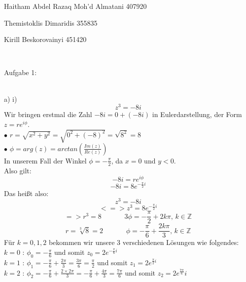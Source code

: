 \documentclass[11pt]{article}
\begin{document}
	\noindent \begin{huge}Haitham Abdel Razaq Moh'd Almatani  407920
	
	\noindent Themistoklis Dimaridis 355835
	
	
	\noindent Kirill Beskorovainyi 	451420\end{huge}\\\vspace{0.05in}
	
		\noindent \begin{Large}Aufgabe 1:\end{Large}\\[2pt]
			\indent a) \hspace{20pt} i)\\
				$$z^3 = -8i$$
				Wir bringen erstmal die Zahl $-8i=0+(-8i)$ in Eulerdarstellung, der Form $z=re^{i\phi}$.\\
				$\bullet$  $r=\sqrt{x^2+y^2}=\sqrt{0^2+(-8)^2}=\sqrt{8^2}=8$\\
				$\bullet$  $\phi = arg(z) = arctan\left(\frac{Im(z)}{Re(z)}\right)$\\
				\indent \indent In unserem Fall der Winkel $\phi = -\frac{\pi}{2}$, da $x=0$ und $y<0$.\\
				Also gilt:\\
				$$-8i=re^{i\phi}$$
				$$-8i=8e^{-\frac{\pi}{2}i}$$
				Das heißt also:\\
				$$z^3=-8i$$
				$$<=>z^3=8e^{-\frac{\pi}{2}i}$$
				$$=> r^3 = 8 \hspace{40pt} 3\phi = -\frac{\pi}{2}+2k\pi \mbox{, } k\in \mathbb{Z}$$
				$$r=\sqrt[3]{8}=2 \hspace{40pt} \phi = -\frac{\pi}{6}+\frac{2k\pi}{3} \mbox{, } k\in \mathbb{Z}$$
				Für $k=0,1,2$ bekommen wir unsere $3$ verschiedenen Lösungen wie folgendes:\\
				\indent $k=0$ \hspace{10pt}: \hspace{10pt} $\phi_0=-\frac{\pi}{6}$ und somit $z_0=2e^{-\frac{\pi}{6}i}$\\
				\indent $k=1$ \hspace{10pt}: \hspace{10pt} $\phi_1=-\frac{\pi}{6} + \frac{2\pi}{3}=\frac{3\pi}{6}=\frac{\pi}{2}$ und somit $z_1=2e^{\frac{\pi}{2}i}$\\
				\indent $k=2$ \hspace{10pt}: \hspace{10pt} $\phi_2=-\frac{\pi}{6}+\frac{2\times 2 \pi}{3}=-\frac{\pi}{6}+\frac{4\pi}{3}=\frac{7\pi}{6}$ und somit $z_2=2e^\frac{7\pi}{6}i$\\
\end{document}
